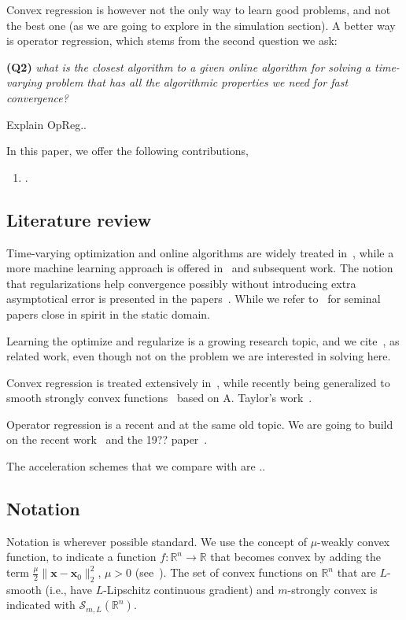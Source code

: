 \documentclass{article}
\newcommand{\R}{\mathbb{R}}
\newcommand{\x}{\mathbold{x}}
\begin{document}
Convex regression is however not the only way to learn good problems, and not the best one (as we are going to explore in the simulation section). A better way is operator regression, which stems from the second question we ask: 

{\bf (Q2) } \emph{what is the closest algorithm to a given online algorithm for solving a time-varying problem that has all the algorithmic properties we need for fast convergence?  
}






Explain OpReg.. 

In this paper, we offer the following contributions,
\begin{enumerate}
\item . 
\end{enumerate}

\subsection{Literature review}

Time-varying optimization and online algorithms are widely treated in~\cite{.,.,.}, while a more machine learning approach is offered in~\cite{.} and subsequent work. The notion that regularizations help convergence possibly without introducing extra asymptotical error is presented in the papers~\cite{.,.,.}. While we refer to~\cite{1,2} for seminal papers close in spirit in the static domain. 

Learning the optimize and regularize is a growing research topic, and we cite~\cite{.,.}, as related work, even though not on the problem we are interested in solving here. 

Convex regression is treated extensively in~\cite{.,.,.}, while recently being generalized to smooth strongly convex functions~\cite{.} based on A. Taylor's work~\cite{.}.

Operator regression is a recent and at the same old topic. We are going to build on the recent work~\cite{.} and the 19?? paper~\cite{.}.

The acceleration schemes that we compare with are .. 

\subsection{Notation}

Notation is wherever possible standard. We use the concept of $\mu$-weakly convex function, to indicate a function $f:\R^n \to \R$ that becomes convex by adding the term $\frac{\mu}{2} \|\x-\x_0\|^2_2$, $\mu >0$ (see~\cite{1,2,3}). The set of convex functions on $\R^n$ that are $L$-smooth (i.e., have $L$-Lipschitz continuous gradient) and $m$-strongly convex is indicated with $\mathcal{S}_{m,L}(\R^n)$.
\end{document}
